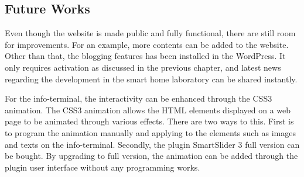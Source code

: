 \subsection{Future Works}
Even though the website is made public and fully functional, there are still room for improvements. For an example, more contents can be added to the website. Other than that, the blogging features has been installed in the WordPress. It only requires activation as discussed in the previous chapter, and latest news regarding the development in the smart home laboratory can be shared instantly.

For the info-terminal, the interactivity can be enhanced through the CSS3 animation. The CSS3 animation allows the HTML elements displayed on a web page to be animated through various effects. There are two ways to this. First is to program the animation manually and applying to the elements such as images and texts on the info-terminal. Secondly, the plugin SmartSlider 3 full version can be bought. By upgrading to full version, the animation can be added through the plugin user interface without any programming works.

